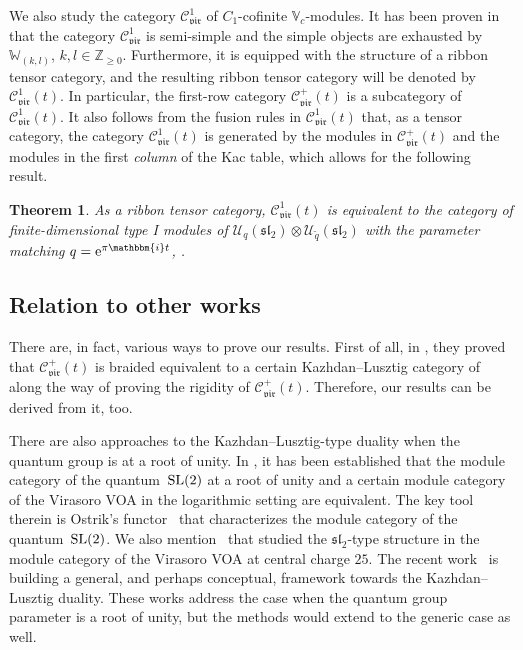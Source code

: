 \documentclass[10pt,a4paper]{amsart}
\numberwithin{equation}{section}
\newtheorem{thm}{Theorem}[section]
\newcommand{\what}[1]{\widehat{#1}}
\newcommand{\bZ}{\mathbb{Z}}
\newcommand{\cC}{\mathcal{C}}
\newcommand{\cU}{\mathcal{U}}
\newcommand{\fsl}{\mathfrak{sl}}
\newcommand{\bbmi}{\mathbbm{i}}
\newcommand{\UEA}{\cU}
\newcommand{\Uq}{\UEA_{q}}
\newcommand{\catVir}{\cC_{\vir}}
\newcommand{\virvoa}{\mathbb{V}}
\newcommand{\virmod}{\mathbb{W}}
\newcommand{\vir}{\mathfrak{vir}}
\begin{document}
We also study the category $\catVir^{1}$ of $C_{1}$-cofinite $\virvoa_{c}$-modules.
It has been proven in~\cite{CJORY-tensor_categories_arising_from_Virasoro_algebra} that the category $\catVir^{1}$ is semi-simple and the simple objects are exhausted by $\virmod_{(k,l)}$, $k,l \in\bZ_{\geq 0}$.
Furthermore, it is equipped with the structure of a ribbon tensor category,
and the resulting ribbon tensor category will be denoted by $\catVir^{1}(t)$.
In particular, the first-row category $\catVir^{+}(t)$ is a subcategory of $\catVir^{1}(t)$.
It also follows from the fusion rules in $\catVir^{1}(t)$ that, as a tensor category,
the category $\catVir^{1}(t)$ is generated by the modules in $\catVir^{+}(t)$ and the modules in the first {\it column} of the Kac table,
which allows for the following result.

\begin{thm}
\label{thm:C1-cat_QG}
As a ribbon tensor category, $\catVir^{1}(t)$ is equivalent to the category of finite-dimensional type I modules of $\Uq (\fsl_{2})\otimes \cU_{\tilde{q}}(\fsl_{2})$ with the parameter matching $q = {\rm e}^{\pi\bbmi t}$, \smash{$\tilde{q} = {\rm e}^{\pi \bbmi t^{-1}}$}.
\end{thm}

\subsection{Relation to other works}
There are, in fact, various ways to prove our results.
First of all, in \cite{CJORY-tensor_categories_arising_from_Virasoro_algebra},
they proved that $\catVir^{+}(t)$ is braided equivalent to a certain Kazhdan--Lusztig category of \smash{$\what{\fsl}_{2}$} along the way of proving the rigidity of $\catVir^{+}(t)$.
Therefore, our results can be derived from it, too.


There are also approaches to the Kazhdan--Lusztig-type duality when the quantum group is at a root of unity.
In \cite{GannonNegron-quantum_sltwo_and_log_VOAs}, it has been established that the module category of the quantum~${\rm SL}(2)$ at a root of unity and a certain module category of the Virasoro VOA in the logarithmic setting are equivalent.
The key tool therein is Ostrik's functor~\cite{ostrik2005module} that characterizes the module category of the quantum~${\rm SL}(2)$.
We also mention~\cite{McRaeYang2022} that studied the $\fsl_{2}$-type structure in the module category of the Virasoro VOA at central charge $25$.
The recent work~\cite{creutzig2023algebraic,lentner2025conditional} is building a general, and perhaps conceptual, framework towards the Kazhdan--Lusztig duality.
These works address the case when the quantum group parameter is a root of unity, but the methods would extend to the generic case as well.
\end{document}
